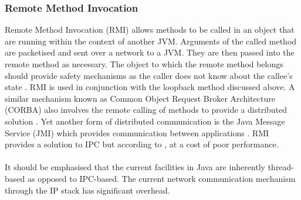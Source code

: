 \documentclass[12pt,a4paper,oneside]{article}
\begin{document}
\subsubsection{Remote Method Invocation}
\begin{spacing}{1.4}
Remote Method Invocation (RMI) allows methods to be called in an object that are running within the context of another JVM. Arguments of the called method are packetised and sent over a network to a JVM. They are then passed into the remote method as necessary. The object to which the remote method belongs should provide safety mechanisms as the caller does not know about the callee's state \citep{JavaConcurrencyInPractice}. RMI is used in conjunction with the loopback method discussed above. A similar mechanism known as Common Object Request Broker Architecture (CORBA) also involves the remote calling of methods to provide a distributed solution \citep{WellsIPCMultiProc}. Yet another form of distributed communication is the Java Message Service (JMI) which provides communication between applications \citep{JavaAPI}. RMI provides a solution to IPC but according to \cite{taboada2013javaforHPC}, at a cost of poor performance.
\\\\
It should be emphasised that the current facilities in Java are inherently thread-based as opposed to IPC-based. The current network communication mechanism through the IP stack has significant overhead.
\end{spacing}
\end{document}
